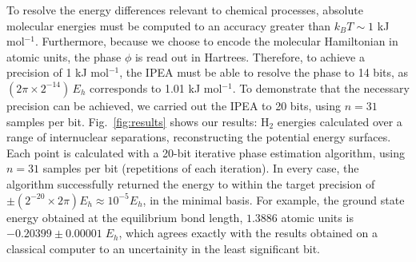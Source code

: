 \documentclass[11pt,oneside,final]{huthesis}%
\begin{document}
To resolve the energy differences relevant to chemical processes, absolute 
molecular energies must be computed to an accuracy greater than $k_B T \sim 1$ kJ mol$^{-1}$.
Furthermore, because we choose to encode the molecular Hamiltonian in atomic units, the 
phase $\phi$ is read out in Hartrees. Therefore, to 
achieve a precision of 1 kJ mol$^{-1}$, the IPEA must be able to resolve the phase to 14 bits, as 
$(2\pi \times 2^{-14})\,E_h$ corresponds to 1.01 kJ mol$^{-1}$.                                        
To demonstrate that the necessary precision can be achieved, we
carried out the IPEA to 20 bits, using $n=31$ samples per bit.
Fig.~\ref{fig:results} shows our results: H$_2$ energies calculated over a range of
internuclear separations, reconstructing the potential energy surfaces. Each point is calculated with a 20-bit iterative phase estimation 
algorithm, using $n=31$ samples per bit (repetitions of each iteration). 
In every case, the algorithm successfully returned the
energy to within the target precision of $\pm (2^{-20}\times 2\pi)E_h\approx10^{-5}E_h$, in the
minimal basis.  For example, the ground state energy obtained at the 
equilibrium bond length, $1.3886$ atomic units is $-0.20399\pm0.00001\;E_h$, which agrees
exactly with the results obtained on a classical computer to an uncertainity in the least
significant bit.
\end{document}
